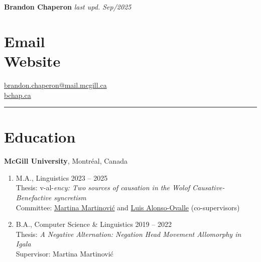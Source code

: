 \documentclass[margin,line]{resume}
\begin{document}
{\Large \textbf{Brandon Chaperon} \hfill\footnotesize {\it last upd. Sep/2025} \hphantom{.............................}}
\begin{resume}


	\section{\mysidestyle Email \vspace{0.3em}\\Website}
	\href{mailto:brandon.chaperon@mail.mcgill.ca}{brandon.chaperon@mail.mcgill.ca}\vspace{0.3em}\\
	\href{https://bchaper0n.github.io/}{bchap.ca}



	\vspace{-1em}\rule{\columnwidth}{0.4pt}


	\vspace{-0.7em}

	\section{\mysidestyle Education}

	\textbf{McGill University}, Montr\'{e}al, Canada
	\begin{enumerate}[-, leftmargin=1em, topsep=2pt]
		\item[] M.A., %
		      Linguistics%
		      \hfill 2023 -- 2025 \\
			  {\small Thesis: {v}-al-\textit{ency: Two sources of causation in the Wolof Causative-Benefactive syncretism}\\
			  Committee: \href{https://inamartinovic.com/}{Martina Martinović} and \href{https://people.linguistics.mcgill.ca/~luis.alonso-ovalle/}{Luis Alonso-Ovalle} (co-supervisors)}\vspace{0.2em}
		\item[] B.A., %
		      Computer Science %
		      \& %
		      Linguistics%
		      \hfill 2019 -- 2022\\
			  {\small Thesis: {\it A Negative Alternation: Negation Head Movement Allomorphy in Igala}\\
			  Supervisor: Martina Martinović}
	\end{enumerate}


\end{resume}
\end{document}
